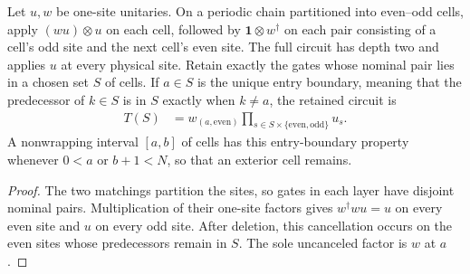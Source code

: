 \begin{lemma}
    \label{lem:mpug_detector_endpoint_circuit}
    \leanok
    Let $u,w$ be one-site unitaries. On a periodic chain partitioned into
    even--odd cells, apply $(wu)\otimes u$ on each cell, followed by
    $\mathbf 1\otimes w^{\dagger}$ on each pair consisting of a cell's odd
    site and the next cell's even site. The full circuit has depth two and
    applies $u$ at every physical site. Retain exactly the gates whose
    nominal pair lies in a chosen set $S$ of cells. If $a\in S$ is the unique entry boundary,
    meaning that the predecessor of $k\in S$ is in $S$ exactly when $k\ne a$,
    the retained circuit is
    \begin{align}
        T(S) & =w_{(a,\mathrm{even})}\prod_{s\in S\times\{\mathrm{even},\mathrm{odd}\}}u_s.
        \label{eq:mpug_endpoint_circuit_interval}
    \end{align}
    A nonwrapping interval $[a,b]$ of cells has this entry-boundary
    property whenever $0<a$ or $b+1<N$, so that an exterior cell remains.
\end{lemma}

\begin{proof}\leanok
    The two matchings partition the sites, so gates in each layer have
    disjoint nominal pairs. Multiplication of their one-site factors gives
    $w^{\dagger}wu=u$ on every even site and $u$ on every odd site.
    After deletion, this cancellation occurs on the even sites whose
    predecessors remain in $S$. The sole uncanceled factor is $w$ at $a$.
\end{proof}

